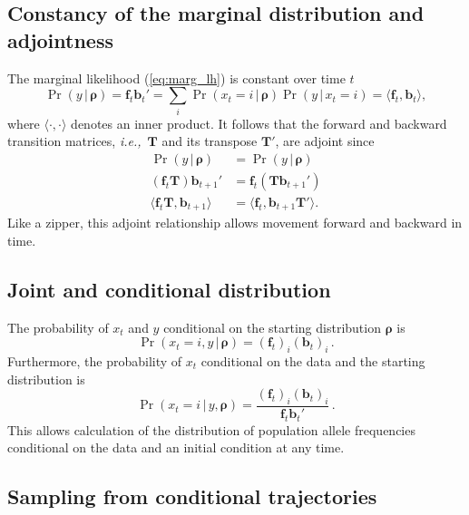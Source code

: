 \documentclass[preprint]{elsarticle}
\newcommand{\bs}[1]{\ensuremath{\boldsymbol{#1}}}
\newcommand\given{{\,|\,}}
\newcommand\ie{{\it i.e.,}}
\newcommand\x[1]{\ensuremath{x_{#1}}}
\newcommand\y{\ensuremath{y}}
\newcommand\fv[1]{\ensuremath{\mathbf{f}_{#1}}}
\newcommand\bv[1]{\ensuremath{\mathbf{b}_{#1}}}
\begin{document}
\subsection{Constancy of the marginal distribution and adjointness}

The marginal likelihood (\ref{eq:marg_lh}) is constant over time $t$ 
\begin{equation}
\Pr(\y \given \bs{\rho}) = \fv{t}\bv{t}' =\sum_i \Pr(\x{t}=i \given \bs{\rho}) \Pr(\y \given \x{t}=i) = \langle\fv{t}, \bv{t} \rangle,
\end{equation}
where $\langle \cdot , \cdot \rangle$ denotes an inner product.  It follows that the forward and backward transition matrices, \ie\ $\mathbf{T}$ and its transpose $\mathbf{T}'$, are adjoint since
\begin{equation}\label{eq:adjoint_discrete}
\begin{split}
\Pr(\y \given \bs{\rho})              &= \Pr(\y \given \bs{\rho}) \\
(\fv{t}\mathbf{T})\bv{t+1}' &= \fv{t} (\mathbf{T}\bv{t+1}') \\
\langle \fv{t}\mathbf{T},\bv{t+1} \rangle  &= \langle\fv{t},\bv{t+1}\mathbf{T}' \rangle.
\end{split}
\end{equation}
Like a zipper, this adjoint relationship allows movement forward and backward in time.

\subsection{Joint and conditional distribution}

The probability of $\x{t}$ and $\y$ conditional on the starting distribution $\bs{\rho}$ is \begin{equation}\label{eq:joint_xy_discr}
\Pr(\x{t}=i,\y \given \bs{\rho}) = (\fv{t})_i (\bv{t})_i\,.
\end{equation}
Furthermore, the probability of $\x{t}$ conditional on the data and the starting distribution is
\begin{equation}\label{eq:cond_x|y_discr}
\Pr(\x{t}=i \given \y,\bs{\rho}) = \frac{(\fv{t})_i (\bv{t})_i}{\fv{t}\bv{t}'}\,.
\end{equation}
This allows calculation of the distribution of population allele frequencies conditional on the data and an initial condition at any time. 

\subsection{Sampling from conditional trajectories}
\end{document}
